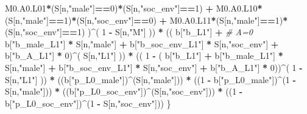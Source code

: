 \documentclass[
]{book}
\newenvironment{Shaded}{\begin{snugshade}}{\end{snugshade}}
\newcommand{\CommentTok}[1]{\textcolor[rgb]{0.56,0.35,0.01}{\textit{#1}}}
\newcommand{\DecValTok}[1]{\textcolor[rgb]{0.00,0.00,0.81}{#1}}
\newcommand{\NormalTok}[1]{#1}
\newcommand{\SpecialCharTok}[1]{\textcolor[rgb]{0.81,0.36,0.00}{\textbf{#1}}}
\newcommand{\StringTok}[1]{\textcolor[rgb]{0.31,0.60,0.02}{#1}}
\begin{document}
\begin{Shaded}
\begin{Highlighting}[]
\NormalTok{          M0.A0.L01}\SpecialCharTok{*}\NormalTok{(S[n,}\StringTok{"male"}\NormalTok{]}\SpecialCharTok{==}\DecValTok{0}\NormalTok{)}\SpecialCharTok{*}\NormalTok{(S[n,}\StringTok{"soc\_env"}\NormalTok{]}\SpecialCharTok{==}\DecValTok{1}\NormalTok{) }\SpecialCharTok{+}
\NormalTok{          M0.A0.L10}\SpecialCharTok{*}\NormalTok{(S[n,}\StringTok{"male"}\NormalTok{]}\SpecialCharTok{==}\DecValTok{1}\NormalTok{)}\SpecialCharTok{*}\NormalTok{(S[n,}\StringTok{"soc\_env"}\NormalTok{]}\SpecialCharTok{==}\DecValTok{0}\NormalTok{) }\SpecialCharTok{+} 
\NormalTok{          M0.A0.L11}\SpecialCharTok{*}\NormalTok{(S[n,}\StringTok{"male"}\NormalTok{]}\SpecialCharTok{==}\DecValTok{1}\NormalTok{)}\SpecialCharTok{*}\NormalTok{(S[n,}\StringTok{"soc\_env"}\NormalTok{]}\SpecialCharTok{==}\DecValTok{1}\NormalTok{) )}\SpecialCharTok{\^{}}\NormalTok{( }\DecValTok{1} \SpecialCharTok{{-}}\NormalTok{ S[n,}\StringTok{"M"}\NormalTok{] )) }\SpecialCharTok{*}
\NormalTok{      (( b[}\StringTok{"b\_L1"}\NormalTok{] }\SpecialCharTok{+}                                                            \CommentTok{\# A=0}
\NormalTok{           b[}\StringTok{"b\_male\_L1"}\NormalTok{] }\SpecialCharTok{*}\NormalTok{ S[n,}\StringTok{"male"}\NormalTok{] }\SpecialCharTok{+}  
\NormalTok{           b[}\StringTok{"b\_soc\_env\_L1"}\NormalTok{] }\SpecialCharTok{*}\NormalTok{ S[n,}\StringTok{"soc\_env"}\NormalTok{] }\SpecialCharTok{+}
\NormalTok{           b[}\StringTok{"b\_A\_L1"}\NormalTok{] }\SpecialCharTok{*} \DecValTok{0}\NormalTok{)}\SpecialCharTok{\^{}}\NormalTok{( S[n,}\StringTok{"L1"}\NormalTok{] )) }\SpecialCharTok{*}
\NormalTok{      (( }\DecValTok{1} \SpecialCharTok{{-}}\NormalTok{ ( b[}\StringTok{"b\_L1"}\NormalTok{] }\SpecialCharTok{+}
\NormalTok{                 b[}\StringTok{"b\_male\_L1"}\NormalTok{] }\SpecialCharTok{*}\NormalTok{ S[n,}\StringTok{"male"}\NormalTok{] }\SpecialCharTok{+}  
\NormalTok{                 b[}\StringTok{"b\_soc\_env\_L1"}\NormalTok{] }\SpecialCharTok{*}\NormalTok{ S[n,}\StringTok{"soc\_env"}\NormalTok{] }\SpecialCharTok{+}
\NormalTok{                 b[}\StringTok{"b\_A\_L1"}\NormalTok{] }\SpecialCharTok{*} \DecValTok{0}\NormalTok{))}\SpecialCharTok{\^{}}\NormalTok{( }\DecValTok{1} \SpecialCharTok{{-}}\NormalTok{ S[n,}\StringTok{"L1"}\NormalTok{] )) }\SpecialCharTok{*}
\NormalTok{      ((b[}\StringTok{"p\_L0\_male"}\NormalTok{])}\SpecialCharTok{\^{}}\NormalTok{(S[n,}\StringTok{"male"}\NormalTok{])) }\SpecialCharTok{*} 
\NormalTok{      ((}\DecValTok{1} \SpecialCharTok{{-}}\NormalTok{ b[}\StringTok{"p\_L0\_male"}\NormalTok{])}\SpecialCharTok{\^{}}\NormalTok{(}\DecValTok{1} \SpecialCharTok{{-}}\NormalTok{ S[n,}\StringTok{"male"}\NormalTok{])) }\SpecialCharTok{*} 
\NormalTok{      ((b[}\StringTok{"p\_L0\_soc\_env"}\NormalTok{])}\SpecialCharTok{\^{}}\NormalTok{(S[n,}\StringTok{"soc\_env"}\NormalTok{])) }\SpecialCharTok{*}
\NormalTok{      ((}\DecValTok{1} \SpecialCharTok{{-}}\NormalTok{ b[}\StringTok{"p\_L0\_soc\_env"}\NormalTok{])}\SpecialCharTok{\^{}}\NormalTok{(}\DecValTok{1} \SpecialCharTok{{-}}\NormalTok{ S[n,}\StringTok{"soc\_env"}\NormalTok{])) }
\NormalTok{    \}}
  

\end{Highlighting}
\end{Shaded}
\end{document}

